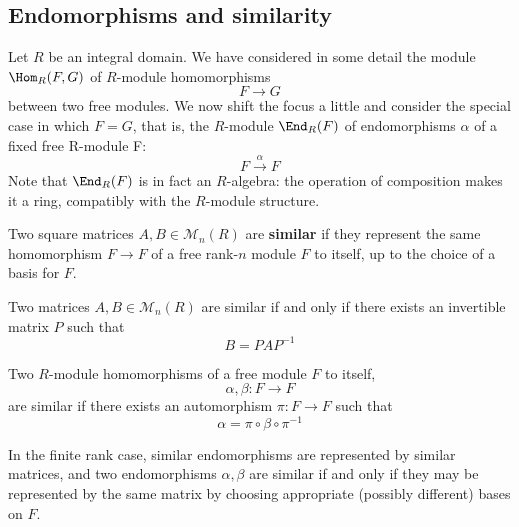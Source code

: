\subsection{Endomorphisms and similarity}
Let $R$ be an integral domain. We have considered in some detail the module $\Hom_R(F,G)$ of $R$-module homomorphisms
\[F\to G\]
between two free modules. We now shift the focus a little and consider the special case in which $F=G$, that is, the $R$-module $\End_R(F)$ of endomorphisms $\alpha$ of a fixed free R-module F:
\[F\stackrel{\alpha}{\to}F\]
Note that $\End_R(F)$ is in fact an $R$-algebra: the operation of composition makes it a ring, compatibly with the $R$-module structure.
\begin{definition}
Two square matrices $A,B\in\mathcal{M}_n(R)$ are \textbf{similar} if they represent the same homomorphism $F\to F$ of a free rank-$n$ module $F$ to itself, up to the choice of a basis for $F$.
\end{definition}
\begin{proposition}
Two matrices $A,B\in\mathcal{M}_n(R)$ are similar if and only if there exists an invertible matrix $P$ such that
\[B=PAP^{-1}\]
\end{proposition}
\begin{definition}
Two $R$-module homomorphisms of a free module $F$ to itself,
\[\alpha,\beta:F\to F\]
are similar if there exists an automorphism $\pi:F\to F$ such that
\[\alpha=\pi\circ\beta\circ\pi^{-1}\]
\end{definition}
In the finite rank case, similar endomorphisms are represented by similar matrices, and two endomorphisms $\alpha,\beta$ are similar if and only if they may be represented by the same matrix by choosing appropriate (possibly different) bases on $F$.
